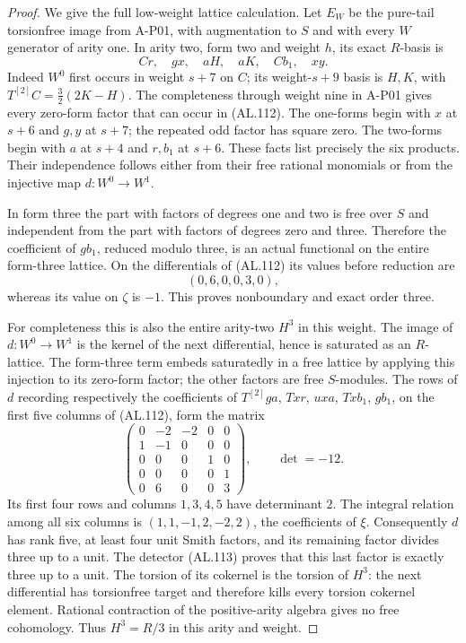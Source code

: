 \begin{proof}
We give the full low-weight lattice calculation.
Let $E_W$ be the pure-tail torsionfree image from A-P01,
with augmentation to $S$ and with every $W$ generator
of arity one. In arity two, form two and weight $h$,
its exact $R$-basis is
\[
                Cr,\quad gx,\quad aH,\quad aK,
                          \quad Cb_1,\quad xy.
 \tag{AL.112}
\]
Indeed $W^0$ first occurs in weight $s+7$ on $C$;
its weight-$s+9$ basis is $H,K$, with
$T^{[2]}C=\frac32(2K-H)$.
The completeness through weight nine in A-P01 gives
every zero-form factor that can occur in (AL.112).
The one-forms begin with $x$ at $s+6$ and $g,y$ at
$s+7$; the repeated odd factor has square zero.
The two-forms begin with $a$ at $s+4$ and $r,b_1$
at $s+6$. These facts list precisely the six products.
Their independence follows either from their free rational
monomials or from the injective map $d:W^0\to W^1$.

In form three the part with factors of degrees one and
two is free over $S$ and independent from the part with
factors of degrees zero and three. Therefore the coefficient
of $gb_1$, reduced modulo three, is an actual functional
on the entire form-three lattice. On the differentials
of (AL.112) its values before reduction are
\[
                              (0,6,0,0,3,0),
 \tag{AL.113}
\]
whereas its value on $\zeta$ is $-1$.
This proves nonboundary and exact order three.

For completeness this is also the entire arity-two $H^3$
in this weight. The image of $d:W^0\to W^1$ is the kernel
of the next differential, hence is saturated as an $R$-lattice.
The form-three term embeds saturatedly in a free lattice
by applying this injection to its zero-form factor;
the other factors are free $S$-modules.
The rows of $d$ recording respectively the coefficients of
$T^{[2]}ga$, $Txr$, $uxa$, $Txb_1$, $gb_1$, on the first
five columns of (AL.112), form the matrix
\[
 \begin{pmatrix}
 0&-2&-2&0&0\\
 1&-1&0&0&0\\
 0&0&0&1&0\\
 0&0&0&0&1\\
 0&6&0&0&3
 \end{pmatrix},\qquad \det=-12.
 \tag{AL.114}
\]
Its first four rows and columns $1,3,4,5$ have determinant
$2$. The integral relation among all six columns is
$(1,1,-1,2,-2,2)$, the coefficients of $\xi$.
Consequently $d$ has rank five, at least four unit Smith
factors, and its remaining factor divides three up to a unit.
The detector (AL.113) proves that this last factor is
exactly three up to a unit.
The torsion of its cokernel is the torsion of $H^3$:
the next differential has torsionfree target and therefore
kills every torsion cokernel element. Rational contraction
of the positive-arity algebra gives no free cohomology.
Thus $H^3=R/3$ in this arity and weight.


\end{proof}
